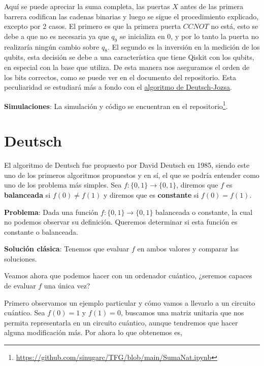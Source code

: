 Aquí se puede apreciar la suma completa, las puertas $X$ antes de las primera barrera codifican las cadenas binarias y luego se sigue el procedimiento explicado, excepto por 2 casos. El primero es que la primera puerta $CCNOT$ no está, esto se debe a que no es necesaria ya que $q_{9}$ se inicializa en 0, y por lo tanto la puerta no realizaría ningún cambio sobre $q_{8}$. El segundo es la inversión en la medición de los qubits, esta decisión se debe a una característica que tiene Qiskit con los qubits, en especial con la base que utiliza. De esta manera nos aseguramos el orden de los bits correctos, como se puede ver en el documento del repositorio. Esta peculiaridad se estudiará más a fondo con el \hyperref[A:DJ]{algoritmo de Deutsch-Jozsa}.\newline

\textbf{Simulaciones}: La simulación y código se encuentran en el repositorio\footnote{\url{https://github.com/sinugarc/TFG/blob/main/SumaNat.ipynb}}.


\section{Deutsch}
\label{Sec3.2:Deutsch}

 El algoritmo de Deutsch\cite{B:QuantumScientist:2008} fue propuesto por David Deutsch en 1985, siendo este uno de los primeros algoritmos propuestos y en sí, el que se podría entender como uno de los problema más simples. Sea $f:\{0,1\}\rightarrow\{0,1\}$, diremos que $f$ es \textbf{balanceada} si $f(0)\neq f(1)$ y diremos que es \textbf{constante} si $f(0)=f(1)$. \newline

 \textbf{Problema}: Dada una función $f:\{0,1\}\rightarrow\{0,1\}$ balanceada o constante, la cual no podemos observar su definición. Queremos determinar si esta función es constante o balanceada.\newline

 \textbf{Solución clásica}: Tenemos que evaluar $f$ en ambos valores y comparar las soluciones.\newline

 Veamos ahora que podemos hacer con un ordenador cuántico, ¿seremos capaces de evaluar $f$ una única vez? \newline

 Primero observamos un ejemplo particular y cómo vamos a llevarlo a un circuito cuántico. Sea $f(0)=1$ y $f(1)=0$, buscamos una matriz unitaria que nos permita representarla en un circuito cuántico, aunque tendremos que hacer alguna modificación más. Por ahora lo que obtenemos es,

